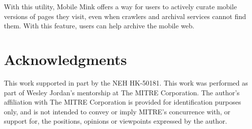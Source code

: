\documentclass{sig-alternate-2013}
\begin{document}
With this utility, Mobile Mink offers a way for users to actively curate mobile versions of pages they visit, even when crawlers and archival services cannot find them. With this feature, users can help archive the mobile web.

\section{Acknowledgments}
This work supported in part by the NEH HK-50181. This work was performed as part of Wesley Jordan's mentorship at The MITRE Corporation. The author's affiliation with The MITRE Corporation is provided for identification purposes only, and is not intended to convey or imply MITRE's concurrence with, or support for, the positions, opinions or viewpoints expressed by the author. 



  
\end{document}
